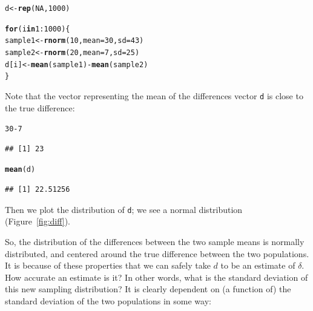 \documentclass[12pt]{book}\usepackage[]{graphicx}\usepackage[]{color}
\makeatletter
\newcommand{\hlnum}[1]{\textcolor[rgb]{0.686,0.059,0.569}{#1}}%
\newcommand{\hlopt}[1]{\textcolor[rgb]{0,0,0}{#1}}%
\newcommand{\hlstd}[1]{\textcolor[rgb]{0.345,0.345,0.345}{#1}}%
\newcommand{\hlkwa}[1]{\textcolor[rgb]{0.161,0.373,0.58}{\textbf{#1}}}%
\newcommand{\hlkwb}[1]{\textcolor[rgb]{0.69,0.353,0.396}{#1}}%
\newcommand{\hlkwc}[1]{\textcolor[rgb]{0.333,0.667,0.333}{#1}}%
\newcommand{\hlkwd}[1]{\textcolor[rgb]{0.737,0.353,0.396}{\textbf{#1}}}%
\newenvironment{kframe}{%
 \def\at@end@of@kframe{}%
 \ifinner\ifhmode%
  \def\at@end@of@kframe{\end{minipage}}%
  \begin{minipage}{\columnwidth}%
 \fi\fi%
 \def\FrameCommand##1{\hskip\@totalleftmargin \hskip-\fboxsep
 \colorbox{shadecolor}{##1}\hskip-\fboxsep
     \hskip-\linewidth \hskip-\@totalleftmargin \hskip\columnwidth}%
 \MakeFramed {\advance\hsize-\width
   \@totalleftmargin\z@ \linewidth\hsize
   \@setminipage}}%
 {\par\unskip\endMakeFramed%
 \at@end@of@kframe}
\newenvironment{knitrout}{}{} %
\makeatother
\begin{document}


\begin{knitrout}
\color{fgcolor}\begin{kframe}
\begin{alltt}
\hlstd{d} \hlkwb{<-} \hlkwd{rep}\hlstd{(}\hlnum{NA}\hlstd{,}\hlnum{1000}\hlstd{)}

\hlkwa{for}\hlstd{(i} \hlkwa{in} \hlnum{1}\hlopt{:}\hlnum{1000}\hlstd{)\{}
  \hlstd{sample1} \hlkwb{<-} \hlkwd{rnorm}\hlstd{(}\hlnum{10}\hlstd{,}\hlkwc{mean}\hlstd{=}\hlnum{30}\hlstd{,}\hlkwc{sd}\hlstd{=}\hlnum{43}\hlstd{)}
  \hlstd{sample2} \hlkwb{<-} \hlkwd{rnorm}\hlstd{(}\hlnum{20}\hlstd{,}\hlkwc{mean}\hlstd{=}\hlnum{7}\hlstd{,}\hlkwc{sd}\hlstd{=}\hlnum{25}\hlstd{)}
  \hlstd{d[i]} \hlkwb{<-} \hlkwd{mean}\hlstd{(sample1)} \hlopt{-} \hlkwd{mean}\hlstd{(sample2)}
\hlstd{\}}
\end{alltt}
\end{kframe}
\end{knitrout}

Note that the vector representing the mean of the
differences vector \texttt{d} is close to the true difference:

\begin{knitrout}
\color{fgcolor}\begin{kframe}
\begin{alltt}
\hlnum{30}\hlopt{-}\hlnum{7}
\end{alltt}
\begin{verbatim}
## [1] 23
\end{verbatim}
\begin{alltt}
\hlkwd{mean}\hlstd{(d)}
\end{alltt}
\begin{verbatim}
## [1] 22.51256
\end{verbatim}
\end{kframe}
\end{knitrout}

\noindent
Then we plot the distribution of \texttt{d}; we see a normal distribution  (Figure~\ref{fig:diff}). 



So, the distribution of the differences between the two sample means is normally distributed, and centered around the true difference between
the two populations. It is because of these properties that we can safely take $d$ to be an estimate of $\delta$. How accurate an
estimate is it? In other words, what is the standard deviation of this new sampling distribution? It is clearly dependent on (a function of) the standard deviation of the two populations in some way: 
\end{document}

